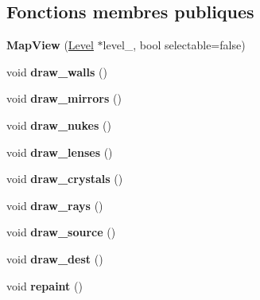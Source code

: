 \subsection*{Fonctions membres publiques}
\begin{DoxyCompactItemize}
\item 
\hypertarget{classMapView_af0587bbc403c323417ea227d247c02c6}{{\bfseries Map\+View} (\hyperlink{classLevel}{Level} $\ast$level\+\_\+, bool selectable=false)}\label{classMapView_af0587bbc403c323417ea227d247c02c6}

\item 
\hypertarget{classMapView_a9243e834166e90fd20bba175fa56a4cc}{void {\bfseries draw\+\_\+walls} ()}\label{classMapView_a9243e834166e90fd20bba175fa56a4cc}

\item 
\hypertarget{classMapView_abb3bba1e54932fc2b64406995881c4ad}{void {\bfseries draw\+\_\+mirrors} ()}\label{classMapView_abb3bba1e54932fc2b64406995881c4ad}

\item 
\hypertarget{classMapView_aafe3dc35cb0938ae7e778b3ddbaf0d87}{void {\bfseries draw\+\_\+nukes} ()}\label{classMapView_aafe3dc35cb0938ae7e778b3ddbaf0d87}

\item 
\hypertarget{classMapView_a636b68282c90dab40dba5984acae2605}{void {\bfseries draw\+\_\+lenses} ()}\label{classMapView_a636b68282c90dab40dba5984acae2605}

\item 
\hypertarget{classMapView_a69e182926c3faeccd627740329451091}{void {\bfseries draw\+\_\+crystals} ()}\label{classMapView_a69e182926c3faeccd627740329451091}

\item 
\hypertarget{classMapView_a47460ba6134d7b9b0f696de8f4f6aa8a}{void {\bfseries draw\+\_\+rays} ()}\label{classMapView_a47460ba6134d7b9b0f696de8f4f6aa8a}

\item 
\hypertarget{classMapView_a7673cc6dc5da8a4312d4588bc3d8b8d0}{void {\bfseries draw\+\_\+source} ()}\label{classMapView_a7673cc6dc5da8a4312d4588bc3d8b8d0}

\item 
\hypertarget{classMapView_afffa3910baaace753c00ce187fd7115a}{void {\bfseries draw\+\_\+dest} ()}\label{classMapView_afffa3910baaace753c00ce187fd7115a}

\item 
\hypertarget{classMapView_a7e354e304c2f0135103a8773a8a8e0d4}{void {\bfseries repaint} ()}\label{classMapView_a7e354e304c2f0135103a8773a8a8e0d4}


\end{DoxyCompactItemize}
